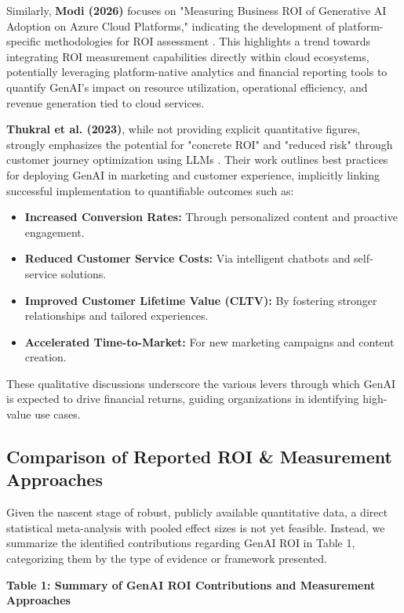 \documentclass[10pt,twocolumn,letterpaper]{article}
\begin{document}
Similarly, \textbf{Modi (2026)} focuses on "Measuring Business ROI of Generative AI Adoption on Azure Cloud Platforms," indicating the development of platform-specific methodologies for ROI assessment \cite{openalex_w4400993506}. This highlights a trend towards integrating ROI measurement capabilities directly within cloud ecosystems, potentially leveraging platform-native analytics and financial reporting tools to quantify GenAI's impact on resource utilization, operational efficiency, and revenue generation tied to cloud services.

\textbf{Thukral et al. (2023)}, while not providing explicit quantitative figures, strongly emphasizes the potential for "concrete ROI" and "reduced risk" through customer journey optimization using LLMs \cite{crossref_10_2139_ssrn_6374778}. Their work outlines best practices for deploying GenAI in marketing and customer experience, implicitly linking successful implementation to quantifiable outcomes such as:
\begin{itemize}
  \item \textbf{Increased Conversion Rates:} Through personalized content and proactive engagement.
  \item \textbf{Reduced Customer Service Costs:} Via intelligent chatbots and self-service solutions.
  \item \textbf{Improved Customer Lifetime Value (CLTV):} By fostering stronger relationships and tailored experiences.
  \item \textbf{Accelerated Time-to-Market:} For new marketing campaigns and content creation.
\end{itemize}

These qualitative discussions underscore the various levers through which GenAI is expected to drive financial returns, guiding organizations in identifying high-value use cases.


\subsection{Comparison of Reported ROI \& Measurement Approaches}


Given the nascent stage of robust, publicly available quantitative data, a direct statistical meta-analysis with pooled effect sizes is not yet feasible. Instead, we summarize the identified contributions regarding GenAI ROI in Table 1, categorizing them by the type of evidence or framework presented.

\textbf{Table 1: Summary of GenAI ROI Contributions and Measurement Approaches}
\end{document}
